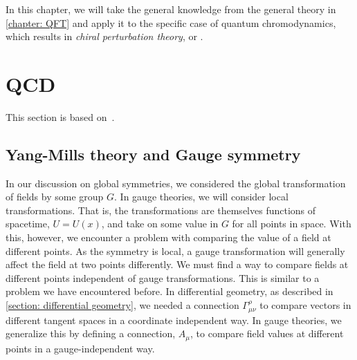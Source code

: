 In this chapter, we will take the general knowledge from the general theory in \autoref{chapter: QFT} and apply it to the specific case of quantum chromodynamics, which results in \emph{chiral perturbation theory}, or \chpt.

\section{QCD}
This section is based on~\autocite{peskinIntroductionQuantumField1995,schererIntroductionChiralPerturbation2002,schwartzQuantumFieldTheory2013}.

\subsection{Yang-Mills theory and Gauge symmetry}
\label{subsection: yang-mills theory and gauge symmetry}


In our discussion on global symmetries, we considered the global transformation of fields by some group $G$.
In gauge theories, we will consider local transformations.
That is, the transformations are themselves functions of spacetime, $U = U(x)$, and take on some value in $G$ for all points in space.
With this, however, we encounter a problem with comparing the value of a field at different points.
As the symmetry is local, a gauge transformation will generally affect the field at two points differently.
We must find a way to compare fields at different points independent of gauge transformations.
This is similar to a problem we have encountered before.
In differential geometry, as described in \autoref{section: differential geometry}, we needed a connection $\Gamma^\rho_{\mu \nu}$ to compare vectors in different tangent spaces in a coordinate independent way.
In gauge theories, we generalize this by defining a connection, $A_\mu$, to compare field values at different points in a gauge-independent way.

